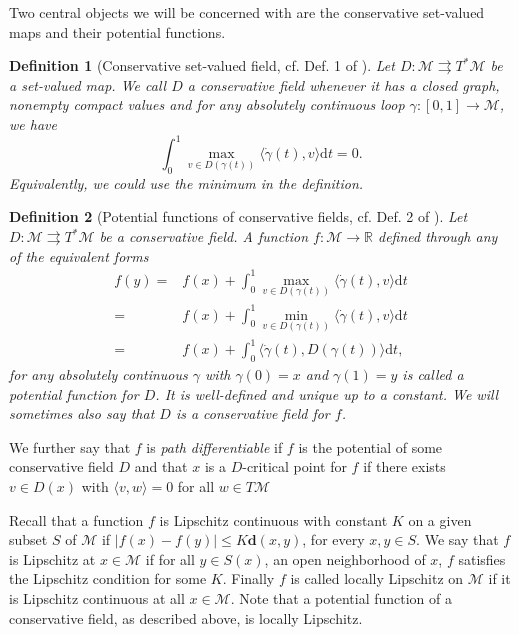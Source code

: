 \documentclass{article}
\newtheorem{definition}{Definition}
\newcommand{\CM}{\mathcal{M}}
\newcommand{\BR}{\mathbb{R}}
\newcommand{\rd}{\mathrm{d}}
\newcommand{\bd}{\mathbf{d}}
\begin{document}
Two central objects we will be concerned with are the conservative set-valued maps and their potential functions. 
\begin{definition}[Conservative set-valued field, cf. Def. 1 of \cite{bolte2021conservative}]
    Let $D: \CM\rightrightarrows T^*\CM$ be a set-valued map. We call $D$ a \emph{conservative field} whenever it has a closed graph, nonempty compact values and for any absolutely continuous loop $\gamma: [0,1]\to \CM$, we have 
    \begin{equation}
        \int_0^1 \max_{v\in D(\gamma(t))}\langle \dot\gamma(t),v\rangle \rd t=0.
    \end{equation}
    Equivalently, we could use the minimum in the definition.
\end{definition}


\begin{definition}[Potential functions of conservative fields, cf. Def. 2 of \cite{bolte2021conservative}]
    Let $D: \CM\rightrightarrows T^*\CM$ be a conservative field. A function $f: \CM\to\BR$ defined through any of the equivalent forms
    \begin{equation}
        \begin{aligned}
            f(y)=& f(x)+\int_0^1\max_{v\in D(\gamma(t))}\langle \dot\gamma(t),v\rangle \rd t \\
           =& f(x)+\int_0^1\min_{v\in D(\gamma(t))}\langle \dot\gamma(t),v\rangle \rd t \\
           =& f(x)+\int_0^1\langle \dot\gamma(t),D(\gamma(t))\rangle\rd t,
        \end{aligned}
    \end{equation}
    for any absolutely continuous $\gamma$ with $\gamma(0)=x$ and $\gamma(1)=y$ is called a \emph{potential function for $D$}. It is well-defined and unique up to a constant. We will sometimes also say that $D$ is a conservative field for $f$. 
\end{definition}

We further say that $f$ is \emph{path differentiable} if $f$ is the potential of some conservative field $D$ and that $x$ is a $D$-critical point for $f$ if there exists $v \in D(x)$ with $\langle v,w\rangle=0$ for all $w\in T\mathcal{M}$ 


Recall that a function $f$ is Lipschitz continuous with constant $K$ on a given subset $S$ of $\CM$ if $|f(x)-f(y)|\leq K\bd(x,y)$, for every $x,y\in S$. We say that $f$ is Lipschitz at $x\in\CM$ if for all $y\in S(x)$, an open neighborhood of $x$, $f$ satisfies the Lipschitz condition for some $K$. Finally $f$ is called locally Lipschitz on $\CM$ if it is Lipschitz continuous at all $x\in\CM$. Note that a potential function of a conservative field, as described above, is locally Lipschitz.
\end{document}
